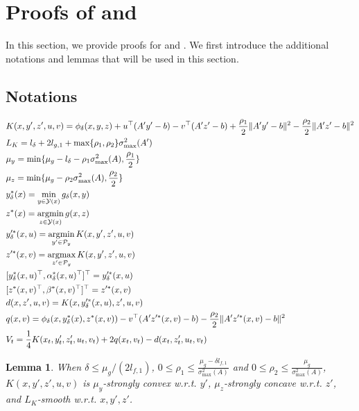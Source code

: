 \documentclass{article}
\newcommand{\Pc}{\mathcal{P}}
\newcommand{\Yc}{\mathcal{Y}}
\newcommand{\argmin}{\mathop{\rm argmin}}
\newcommand{\argmax}{\mathop{\rm argmax}}
\theoremstyle{plain}
\newtheorem{lemma}[theorem]{Lemma}
\theoremstyle{definition}
\theoremstyle{remark}
\begin{document}
\section{Proofs of  and }\label{app: Ay}

In this section, we provide proofs for  and . We first introduce the additional notations and lemmas that will be used in this section.
\subsection*{Notations}
\begin{align*}
    &K(x,y',z',u,v)=\phi_\delta(x, y, z)+u^\top(A'y'-b)- v^\top(A'z'-b)+\frac{\rho_1}{2}\|A'y'-b\|^2-\frac{\rho_2}{2}\|A'z'-b\|^2\\
    &L_K=l_\delta+2 l_{g,1}+\max\{\rho_1, \rho_2\}\sigma_{\max}^2(A')\\
    &\mu_y = \min\{\mu_g-l_\delta-\rho_1\sigma_{\max}^2(A), \frac{\rho_1}{2}\}\\
    &\mu_z = \min\{\mu_g-\rho_2\sigma_{\max}^2(A), \frac{\rho_2}{2}\}\\
    &y^*_\delta(x)=\min_{y \in \Yc(x)} g_{\delta}(x,y)\\
    &z^*(x)=\argmin_{z\in \Yc(x)} g(x,z)\\
    &y'^*_\delta(x,u)=\argmin_{y'\in \Pc_y} K(x,y',z',u,v)\\
    &z'^*(x,v)=\argmax_{z'\in \Pc_y} K(x,y',z',u,v)\\
    &[y^*_\delta(x,u)^\top, \alpha^*_\delta(x,u)^\top]^\top=y'^*_\delta(x,u)\\
    &[z^*(x,v)^\top, \beta^*(x,v)^\top]^\top=z'^*(x,v)\\
    &d(x, z', u, v)=K(x, y'^*_\delta(x,u), z', u,v)\\
    &q(x, v)=\phi_\delta(x, y^*_\delta(x), z^*(x, v))-v^\top(A'z'^*(x, v)-b)-\frac{\rho_2}{2}\|A'z'^*(x, v)-b\|^2\\
    &V_t=\frac{1}{4}K(x_t, y'_t, z'_t, u_t, v_t)+2q(x_t,v_t)-d(x_t,z'_t, u_t, v_t)
\end{align*}

\begin{lemma}\label{lemma: sc of y z}
   When $\delta\leq \mu_g/(2l_{f,1})$, $0\leq \rho_1\leq \frac{\mu_g-\delta l_{f,1}}{\sigma_{\max}^2(A)}$ and $0\leq \rho_2\leq \frac{\mu_g}{\sigma_{\max}^2(A)}$, $K(x,y',z',u,v)$ is $\mu_y$-strongly convex w.r.t. $y'$, $\mu_z$-strongly concave w.r.t. $z'$, and $L_K$-smooth w.r.t. $x, y', z'$.
\end{lemma}
\end{document}

